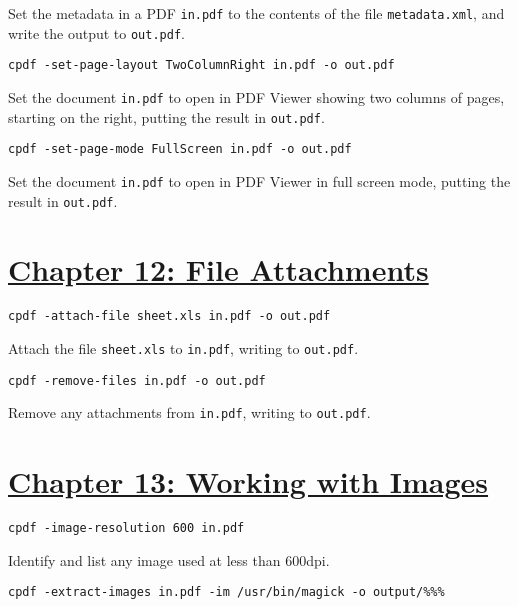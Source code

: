 \documentclass{book}
\begin{document}
\noindent Set the metadata in a PDF \texttt{in.pdf} to the contents of the file \texttt{metadata.xml}, and write the output to \texttt{out.pdf}.

\begin{framed}\noindent\texttt{cpdf -set-page-layout TwoColumnRight in.pdf -o out.pdf}\end{framed}

\noindent Set the document \texttt{in.pdf} to open in PDF Viewer showing two columns of pages, starting on the right, putting the result in \texttt{out.pdf}.

\begin{framed}\noindent\texttt{cpdf -set-page-mode FullScreen in.pdf -o out.pdf}\end{framed}

\noindent Set the document \texttt{in.pdf} to open in PDF Viewer in full screen mode, putting the result in \texttt{out.pdf}.

\section*{\hyperref[chap:12]{Chapter 12: File Attachments}}

\begin{framed}\noindent\texttt{cpdf -attach-file sheet.xls in.pdf -o out.pdf}\end{framed}

\noindent Attach the file \texttt{sheet.xls} to \texttt{in.pdf}, writing to \texttt{out.pdf}.

\begin{framed}\noindent\texttt{cpdf -remove-files in.pdf -o out.pdf}\end{framed}

\noindent Remove any attachments from \texttt{in.pdf}, writing to \texttt{out.pdf}.

\section*{\hyperref[chap:13]{Chapter 13: Working with Images}}

\begin{framed}\noindent\texttt{cpdf -image-resolution 600 in.pdf}\end{framed}

\noindent Identify and list any image used at less than 600dpi.

\begin{framed}\noindent\texttt{cpdf -extract-images in.pdf -im /usr/bin/magick -o output/\%\%\%}\end{framed}
\end{document}
